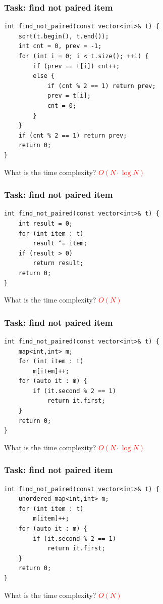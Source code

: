 \documentclass{beamer}
\begin{document}
\begin{frame}[fragile]
    \frametitle{Task: find not paired item}
    \small
    \begin{verbatim}
int find_not_paired(const vector<int>& t) {
    sort(t.begin(), t.end());
    int cnt = 0, prev = -1;
    for (int i = 0; i < t.size(); ++i) {
        if (prev == t[i]) cnt++;
        else {
            if (cnt % 2 == 1) return prev;
            prev = t[i];
            cnt = 0;
        }
    }
    if (cnt % 2 == 1) return prev;
    return 0;
}\end{verbatim}

    \begin{block}{}
    What is the time complexity? \pause \textcolor{red}{$O(N \cdot \log N)$}
    \end{block}
\end{frame}

\begin{frame}[fragile]
    \frametitle{Task: find not paired item}
    \begin{verbatim}
int find_not_paired(const vector<int>& t) {
    int result = 0;
    for (int item : t)
        result ^= item;
    if (result > 0)
        return result;
    return 0;
}\end{verbatim}

    \begin{block}{}
    What is the time complexity? \pause \textcolor{red}{$O(N)$}
    \end{block}
\end{frame}

\begin{frame}[fragile]
    \frametitle{Task: find not paired item}
    \begin{verbatim}
int find_not_paired(const vector<int>& t) {
    map<int,int> m;
    for (int item : t)
        m[item]++;
    for (auto it : m) {
        if (it.second % 2 == 1)
            return it.first;
    }
    return 0;
}\end{verbatim}

    \begin{block}{}
    What is the time complexity? \pause \textcolor{red}{$O(N \cdot \log N)$}
    \end{block}
\end{frame}

\begin{frame}[fragile]
    \frametitle{Task: find not paired item}
    \begin{verbatim}
int find_not_paired(const vector<int>& t) {
    unordered_map<int,int> m;
    for (int item : t)
        m[item]++;
    for (auto it : m) {
        if (it.second % 2 == 1)
            return it.first;
    }
    return 0;
}\end{verbatim}

    \begin{block}{}
    What is the time complexity? \pause \textcolor{red}{$O(N)$}
    \end{block}
\end{frame}
\end{document}
